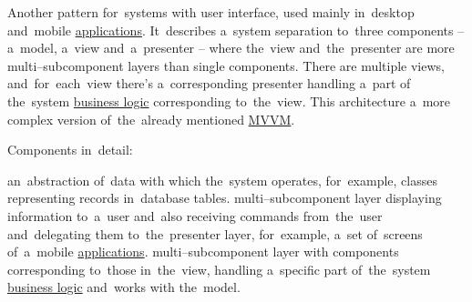 Another pattern for~systems with user interface, used mainly in~desktop and~mobile \hyperref[applicationprocessprogramservicethread]{applications}.
It~describes a~system separation to~three components -- a~model, a~view and~a~presenter -- where the~view and~the~presenter are more multi--subcomponent layers than single components.
There are multiple views, and~for~each~view there's a~corresponding presenter handling a~part of the~system \hyperref[businesslogic]{business logic} corresponding to~the~view.
This architecture a~more complex version of~the~already mentioned \hyperref[mvvm]{MVVM}.
\newline

\noindent Components in~detail:
\begin{itemize}
     an~abstraction of~data with which the~system operates, for~example, classes representing records in~database tables.
     multi--subcomponent layer displaying information to~a~user and~also receiving commands from~the~user and~delegating them to~the~presenter layer, for~example, a~set of~screens of~a~mobile \hyperref[applicationprocessprogramservicethread]{applications}.
     multi--subcomponent layer with components corresponding to~those in~the~view, handling a~specific part of~the~system \hyperref[businesslogic]{business logic} and~works with the~model.
\end{itemize}

